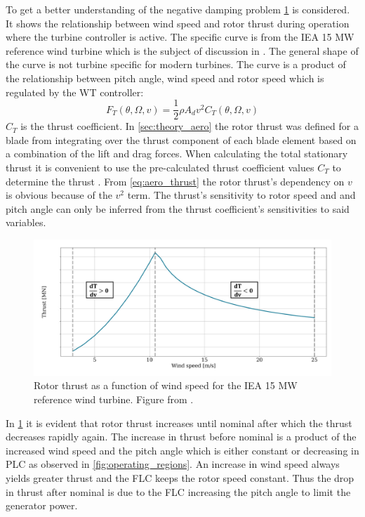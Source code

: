 \smallskip
To get a better understanding of the negative damping problem \cref{fig:thrust_vs_windspeed} is considered. It shows the relationship between wind speed and rotor thrust during operation where the turbine controller is active. The specific curve is from the IEA 15 MW reference wind turbine which is the subject of discussion in \cite{Vanelli2021}. The general shape of the curve is not turbine specific for modern turbines. The curve is a product of the relationship between pitch angle, wind speed and rotor speed which is regulated by the WT controller:
\begin{equation} \label{eq:aero_thrust}
	F_T(\theta, \Omega, v) = \dfrac{1}{2} \rho A_d v^2 C_T(\theta, \Omega, v)
\end{equation}
$ C_T $ is the thrust coefficient. In \cref{sec:theory_aero} the rotor thrust was defined for a blade from integrating over the thrust component of each blade element based on a combination of the lift and drag forces. When calculating the total stationary thrust it is convenient to use the pre-calculated thrust coefficient values $ C_T $ to determine the thrust \cite{Knudsen2013}. From \cref{eq:aero_thrust} the rotor thrust's dependency on $ v $ is obvious because of the $ v^2 $ term. The thrust's sensitivity to rotor speed and and pitch angle can only be inferred from the thrust coefficient's sensitivities to said variables. 
\begin{figure}[ht]
	\centering
	\includegraphics[width=0.85\linewidth]{Graphics/ThrustWindpeedCurve.PNG}
	\caption{Rotor thrust as a function of wind speed for the IEA 15 MW reference wind turbine. Figure from \cite{Vanelli2021}.}
	\label{fig:thrust_vs_windspeed}
\end{figure}
In \cref{fig:thrust_vs_windspeed} it is evident that rotor thrust increases until nominal after which the thrust decreases rapidly again. The increase in thrust before nominal is a product of the increased wind speed and the pitch angle which is either constant or decreasing in PLC as observed in \cref{fig:operating_regions}. An increase in wind speed always yields greater thrust and the FLC keeps the rotor speed constant. Thus the drop in thrust after nominal is due to the FLC increasing the pitch angle to limit the generator power.

